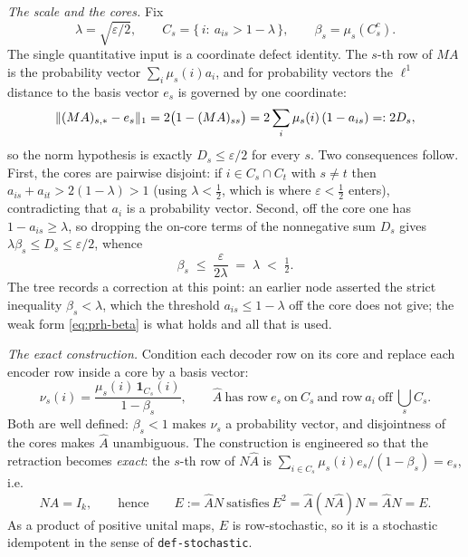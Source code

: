 \emph{The scale and the cores.} Fix
\[
  \lambda=\sqrt{\varepsilon/2},\qquad
  C_s=\{\,i:\ a_{is}>1-\lambda\,\},\qquad
  \beta_s=\mu_s(C_s^{c}).
\]
The single quantitative input is a coordinate defect identity. The $s$-th row of $MA$ is
the probability vector $\sum_i\mu_s(i)a_i$, and for probability vectors the $\ell^1$
distance to the basis vector $e_s$ is governed by one coordinate:
\begin{equation}\label{eq:prh-defect}
  \lVert (MA)_{s,*}-e_s \rVert_{1}=2\bigl(1-(MA)_{ss}\bigr)=2\sum_i\mu_s(i)\,(1-a_{is})=:2D_s,
\end{equation}
so the norm hypothesis is exactly $D_s\le\varepsilon/2$ for every $s$. Two consequences
follow. First, the cores are pairwise disjoint: if $i\in C_s\cap C_t$ with $s\ne t$ then
$a_{is}+a_{it}>2(1-\lambda)>1$ (using $\lambda<\tfrac12$, which is where
$\varepsilon<\tfrac12$ enters), contradicting that $a_i$ is a probability vector. Second,
off the core one has $1-a_{is}\ge\lambda$, so dropping the on-core terms of the
nonnegative sum $D_s$ gives $\lambda\beta_s\le D_s\le\varepsilon/2$, whence
\begin{equation}\label{eq:prh-beta}
  \beta_s\;\le\;\frac{\varepsilon}{2\lambda}\;=\;\lambda\;<\;\tfrac12 .
\end{equation}
The tree records a correction at this point: an earlier node asserted the strict
inequality $\beta_s<\lambda$, which the threshold $a_{is}\le1-\lambda$ off the core does
not give; the weak form \eqref{eq:prh-beta} is what holds and all that is used.

\emph{The exact construction.} Condition each decoder row on its core and replace each
encoder row inside a core by a basis vector:
\[
  \nu_s(i)=\frac{\mu_s(i)\,\mathbf1_{C_s}(i)}{1-\beta_s},
  \qquad
  \widehat A\ \text{has row}\ e_s\ \text{on}\ C_s\ \text{and row}\ a_i\ \text{off}\ \textstyle\bigcup_s C_s .
\]
Both are well defined: $\beta_s<1$ makes $\nu_s$ a probability vector, and disjointness of
the cores makes $\widehat A$ unambiguous. The construction is engineered so that the
retraction becomes \emph{exact}: the $s$-th row of $N\widehat A$ is
$\sum_{i\in C_s}\mu_s(i)e_s/(1-\beta_s)=e_s$, i.e.
\begin{equation}\label{eq:prh-exact}
  N\widehat A=I_k,\qquad\text{hence}\qquad E:=\widehat AN\ \text{satisfies}\ E^2=\widehat A(N\widehat A)N=\widehat AN=E .
\end{equation}
As a product of positive unital maps, $E$ is row-stochastic, so it is a stochastic
idempotent in the sense of \texttt{def-stochastic}.

